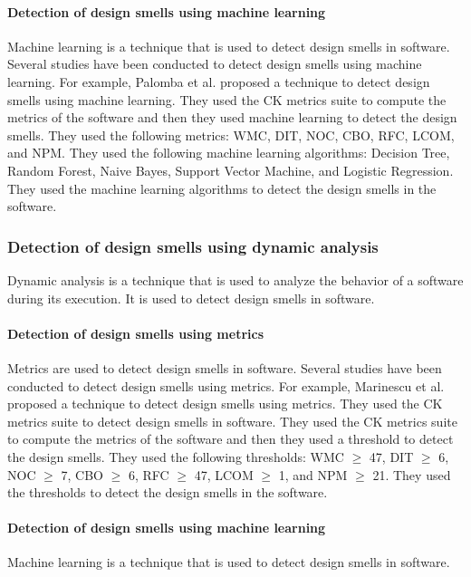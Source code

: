 \paragraph{Detection of design smells using machine learning}
Machine learning is a technique that is used to detect design smells in
software.
Several studies have been conducted to detect design smells using machine
learning. For example, Palomba et al. \cite{palomba2017automatic} proposed a
technique to detect design smells using machine learning. They used the CK
metrics suite \cite{chidamber1994metrics} to compute the metrics of the software
and then they used machine learning to detect the design smells. They used the
following metrics: WMC, DIT, NOC, CBO, RFC, LCOM, and NPM. They used the
following machine learning algorithms: Decision Tree, Random Forest, Naive
Bayes,
Support Vector Machine, and Logistic Regression. They used the machine learning
algorithms to detect the design smells in the software.

\subsubsection{Detection of design smells using dynamic analysis}
Dynamic analysis is a technique that is used to analyze the behavior of a
software during its execution. It is used to detect design smells in software.

\paragraph{Detection of design smells using metrics}
Metrics are used to detect design smells in software. Several studies have been
conducted to detect design smells using metrics. For example, Marinescu et al.
\cite{marinescu2004detection} proposed a technique to detect design smells using
metrics. They used the CK metrics suite \cite{chidamber1994metrics} to detect
design smells in software. They used the CK metrics suite to compute the metrics
of the software and then they used a threshold to detect the design smells. They
used the following thresholds: WMC $\geq$ 47, DIT $\geq$ 6, NOC $\geq$ 7, CBO
$\geq$ 6, RFC $\geq$ 47, LCOM $\geq$ 1, and NPM $\geq$ 21. They used the
thresholds to detect the design smells in the software.

\paragraph{Detection of design smells using machine learning}
Machine learning is a technique that is used to detect design smells in
software.

